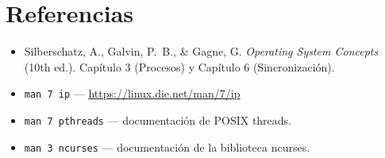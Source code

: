 \documentclass[12pt,a4paper]{article}
\begin{document}
\section*{Referencias}
\begin{itemize}[nosep]
    \item Silberschatz, A., Galvin, P.~B., \& Gagne, G. \textit{Operating System
          Concepts} (10th ed.). Capítulo 3 (Procesos) y Capítulo 6
          (Sincronización).
    \item \texttt{man 7 ip} --- \url{https://linux.die.net/man/7/ip}
    \item \texttt{man 7 pthreads} --- documentación de POSIX threads.
    \item \texttt{man 3 ncurses} --- documentación de la biblioteca ncurses.
\end{itemize}
\end{document}
